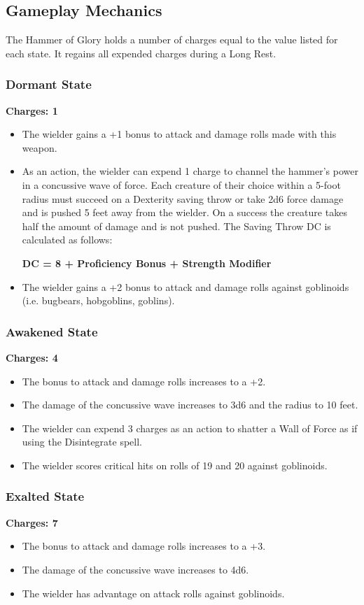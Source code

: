 \subsection*{Gameplay Mechanics}
{\entryfont The Hammer of Glory holds a number of charges equal to the value listed for each state. It regains all expended charges during a Long Rest.
\subsubsection*{Dormant State}
\textbf{Charges: 1}
\begin{itemize}
	\item The wielder gains a +1 bonus to attack and damage rolls made with this weapon.
	\item As an action, the wielder can expend 1 charge to channel the hammer's power in a concussive wave of force. Each creature of their choice within a 5-foot radius must succeed on a Dexterity saving throw or take 2d6 force damage and is pushed 5 feet away from the wielder. On a success the creature takes half the amount of damage and is not pushed. The Saving Throw DC is calculated as follows:
	\begin{center}
		\textbf{DC = 8 + Proficiency Bonus + Strength Modifier}
	\end{center}
	\item The wielder gains a +2 bonus to attack and damage rolls against goblinoids (i.e. bugbears, hobgoblins, goblins).
\end{itemize}
\subsubsection*{Awakened State}
\textbf{Charges: 4}
\begin{itemize}
	\item The bonus to attack and damage rolls increases to a +2.
	\item The damage of the concussive wave increases to 3d6 and the radius to 10 feet.
	\item The wielder  can expend 3 charges as an action to shatter a Wall of Force as if using the Disintegrate spell.
	\item The wielder scores critical hits on rolls of 19 and 20 against goblinoids.
\end{itemize}
\subsubsection*{Exalted State}
\textbf{Charges: 7}
\begin{itemize}
	\item The bonus to attack and damage rolls increases to a +3.
	\item The damage of the concussive wave increases to 4d6.
	\item The wielder has advantage on attack rolls against goblinoids.
\end{itemize}}